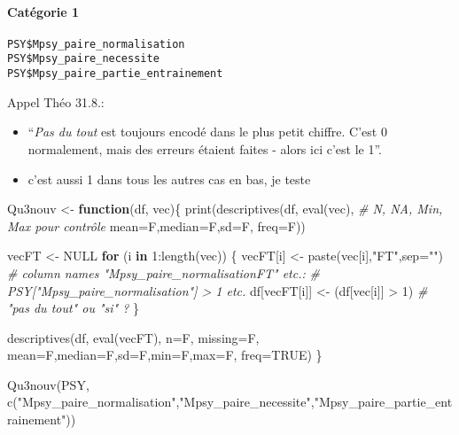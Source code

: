 \documentclass[
]{article}
\newenvironment{Shaded}{\begin{snugshade}}{\end{snugshade}}
\newcommand{\AttributeTok}[1]{\textcolor[rgb]{0.77,0.63,0.00}{#1}}
\newcommand{\CommentTok}[1]{\textcolor[rgb]{0.56,0.35,0.01}{\textit{#1}}}
\newcommand{\ConstantTok}[1]{\textcolor[rgb]{0.00,0.00,0.00}{#1}}
\newcommand{\ControlFlowTok}[1]{\textcolor[rgb]{0.13,0.29,0.53}{\textbf{#1}}}
\newcommand{\DecValTok}[1]{\textcolor[rgb]{0.00,0.00,0.81}{#1}}
\newcommand{\FunctionTok}[1]{\textcolor[rgb]{0.00,0.00,0.00}{#1}}
\newcommand{\NormalTok}[1]{#1}
\newcommand{\OtherTok}[1]{\textcolor[rgb]{0.56,0.35,0.01}{#1}}
\newcommand{\SpecialCharTok}[1]{\textcolor[rgb]{0.00,0.00,0.00}{#1}}
\newcommand{\StringTok}[1]{\textcolor[rgb]{0.31,0.60,0.02}{#1}}
\providecommand{\tightlist}{%
  \setlength{\itemsep}{0pt}\setlength{\parskip}{0pt}}
\begin{document}
\hypertarget{catuxe9gorie-1}{%
\paragraph{Catégorie 1}\label{catuxe9gorie-1}}

\begin{verbatim}
PSY$Mpsy_paire_normalisation
PSY$Mpsy_paire_necessite
PSY$Mpsy_paire_partie_entrainement
\end{verbatim}

Appel Théo 31.8.:

\begin{itemize}
\tightlist
\item
  ``\emph{Pas du tout} est toujours encodé dans le plus petit chiffre.
  C'est 0 normalement, mais des erreurs étaient faites - alors ici c'est
  le 1''.
\item
  c'est aussi 1 dans tous les autres cas en bas, je teste
\end{itemize}

\begin{Shaded}
\begin{Highlighting}[]
\NormalTok{Qu3nouv }\OtherTok{\textless{}{-}} \ControlFlowTok{function}\NormalTok{(df, vec)\{}
  \FunctionTok{print}\NormalTok{(}\FunctionTok{descriptives}\NormalTok{(df, }\FunctionTok{eval}\NormalTok{(vec),            }\CommentTok{\# N, NA, Min, Max pour contrôle}
               \AttributeTok{mean=}\NormalTok{F,}\AttributeTok{median=}\NormalTok{F,}\AttributeTok{sd=}\NormalTok{F,}
               \AttributeTok{freq=}\NormalTok{F))}

\NormalTok{    vecFT }\OtherTok{\textless{}{-}} \ConstantTok{NULL}
  \ControlFlowTok{for}\NormalTok{ (i }\ControlFlowTok{in} \DecValTok{1}\SpecialCharTok{:}\FunctionTok{length}\NormalTok{(vec)) \{}
\NormalTok{    vecFT[i] }\OtherTok{\textless{}{-}} \FunctionTok{paste}\NormalTok{(vec[i],}\StringTok{"FT"}\NormalTok{,}\AttributeTok{sep=}\StringTok{""}\NormalTok{)   }\CommentTok{\# column names "Mpsy\_paire\_normalisationFT" etc.:}
                                          \CommentTok{\# PSY["Mpsy\_paire\_normalisation"]       \textgreater{} 1 etc.}
\NormalTok{    df[vecFT[i]] }\OtherTok{\textless{}{-}}\NormalTok{ (df[vec[i]] }\SpecialCharTok{\textgreater{}} \DecValTok{1}\NormalTok{)      }\CommentTok{\# "pas du tout" ou "si" ?}
\NormalTok{  \}}

  \FunctionTok{descriptives}\NormalTok{(df, }\FunctionTok{eval}\NormalTok{(vecFT),}
               \AttributeTok{n=}\NormalTok{F, }\AttributeTok{missing=}\NormalTok{F,}
               \AttributeTok{mean=}\NormalTok{F,}\AttributeTok{median=}\NormalTok{F,}\AttributeTok{sd=}\NormalTok{F,}\AttributeTok{min=}\NormalTok{F,}\AttributeTok{max=}\NormalTok{F,}
               \AttributeTok{freq=}\ConstantTok{TRUE}\NormalTok{)}
\NormalTok{\}}

\FunctionTok{Qu3nouv}\NormalTok{(PSY, }\FunctionTok{c}\NormalTok{(}\StringTok{"Mpsy\_paire\_normalisation"}\NormalTok{,}\StringTok{"Mpsy\_paire\_necessite"}\NormalTok{,}\StringTok{"Mpsy\_paire\_partie\_entrainement"}\NormalTok{))}
\end{Highlighting}
\end{Shaded}
\end{document}

